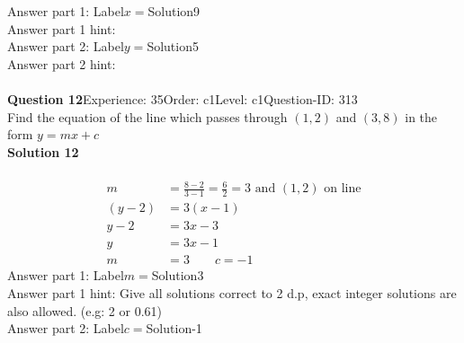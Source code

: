 \documentclass{article}
\begin{document}
Answer part 1: \hspace{10pt}Label\hspace{10pt}$x=$\hspace{10pt}Solution\hspace{10pt}9\\
Answer part 1 hint: \hspace{15pt}\\
Answer part 2: \hspace{10pt}Label\hspace{10pt}$y=$\hspace{10pt}Solution\hspace{10pt}5\\
Answer part 2 hint: \hspace{15pt}\\
\\[4pt]
\noindent\textbf{Question 12}\hspace{20pt}Experience: 35\hspace{20pt}Order: c1\hspace{20pt}Level: c1\hspace{20pt}Question-ID: 313\\[2pt]
Find the equation of the line which passes through $(1,2)$ and $(3,8)$ in the form $y=mx+c$\\[4pt]
\noindent\textbf{Solution 12}\\[2pt]
\\[-35pt]\begin{align*}
m&=\displaystyle\frac{8-2}{3-1}=\displaystyle\frac{6}{2}=3 \,\,\text{and}\,\, (1,2) \,\,\text{on line}\\[2pt]
(y-2)&=3(x-1)\\[2pt]
y-2&=3x-3\\[2pt]
y&=3x-1\\[2pt]
m&=3 \qquad c=-1
\end{align*}
Answer part 1: \hspace{10pt}Label\hspace{10pt}$m=$\hspace{10pt}Solution\hspace{10pt}3\\
Answer part 1 hint: \hspace{15pt}Give all solutions correct to 2 d.p, exact integer solutions are also allowed. (e.g: 2 or 0.61)\\
Answer part 2: \hspace{10pt}Label\hspace{10pt}$c=$\hspace{10pt}Solution\hspace{10pt}-1\\
\end{document}
